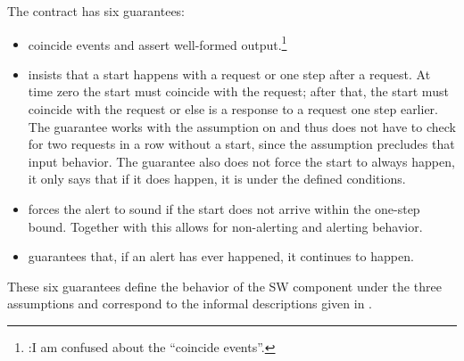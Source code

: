 \noindent The contract has six guarantees:
\begin{itemize}
\item {}
coincide events and assert well-formed output.\footnote{:I am confused about the ``coincide events''.}
\item {} insists that a start happens with a request or one step after a request. At time zero the start must coincide
with the request; after that, the start must coincide with the request
or else is a response to a request one step earlier.  The guarantee
works with the assumption on  and thus does
not have to check for two requests in a row without a start, since the
assumption precludes that input behavior. The guarantee also does not
force the start to always happen, it only says that if it does happen,
it is under the defined conditions.

\item {} forces the alert to sound if the start does not arrive within the one-step bound. Together with  this allows
for non-alerting and alerting behavior.
\item {} guarantees that, if an alert has ever happened,
it continues to happen.
\end{itemize}
These six guarantees define the behavior of the SW component under the
three assumptions and correspond to the informal descriptions given
in .
